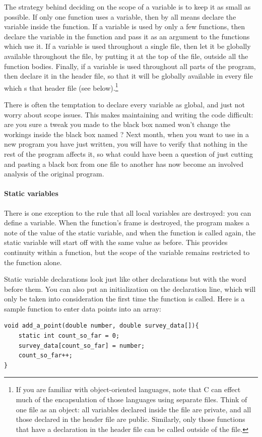 \documentclass[12pt]{article}
\makeatletter
\def\cind#1{\index{#1@\ci{#1}}\ci{#1}}
\makeatother
\begin{document}
The strategy behind deciding on the scope of a variable is
to keep it as small as possible. If only one function uses a variable,
then by all means declare the variable inside the function.
If a variable is used by only a few functions,
then declare the variable in the  function and pass it as an
argument to the functions which use it. If a variable is used throughout
a single file, then let it be globally available throughout the file, by
putting it at the top of the file, outside all the function bodies. Finally,
if a variable is used throughout all parts of the program, then declare it in
the header file, so that it will be globally available in every
file which s that header file (see below).\footnote{If
you are familiar with object-oriented languages, note that C can effect
much of the encapsulation of those languages using separate files. Think
of one file as an object: all variables declared inside the file are
private, and all those declared in the header file are public. Similarly,
only those functions that have a declaration in the header file can be
called outside of the file.}

There is often the temptation to declare every variable as global, and
just not worry about scope issues. This makes maintaining and writing
the code difficult: are you sure a tweak you made to the black box named
 won't change the workings inside the black box named
? Next month, when you want to use 
in a new program you have just written, you will have to verify that nothing
in the rest of the program affects it, so what could have been a question
of just cutting and pasting a black box from one file to another has
now become an involved analysis of the original program.  

\paragraph{\treesymbol Static variables} There is one exception to the rule that
all local variables are destroyed: you can define a 
variable. When the function's frame is destroyed, the program makes a
note of the value of the  static variable, and when the function is called
again, the static variable will start off with the same value
as before. This provides continuity within a function, but the scope
of the variable remains restricted to the function alone.

Static variable declarations look just like other declarations but with
the word \cind{static} before them. You can also put an initialization on
the declaration line, which will only be taken into consideration the
first time the function is called. Here is a sample function to enter 
data points into an array:
\begin{lstlisting}
void add_a_point(double number, double survey_data[]){
    static int count_so_far = 0;
    survey_data[count_so_far] = number;
    count_so_far++;
}
\end{lstlisting}
\end{document}
